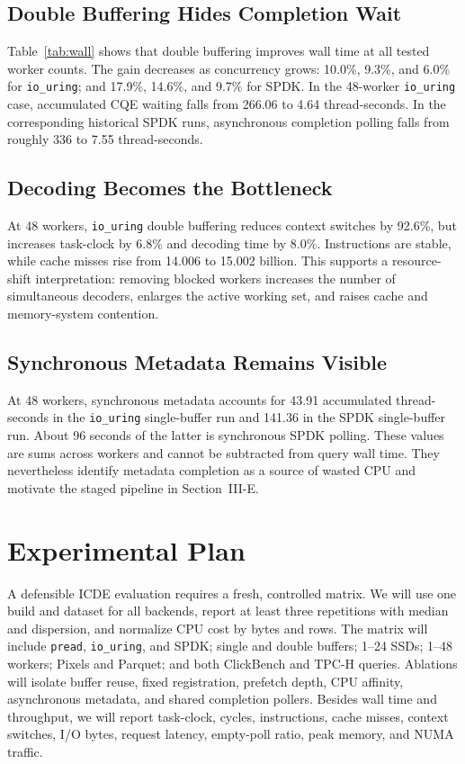 \documentclass[conference]{IEEEtran}
\begin{document}
\subsection{Double Buffering Hides Completion Wait}

Table~\ref{tab:wall} shows that double buffering improves wall time at all
tested worker counts.  The gain decreases as concurrency grows: 10.0\%, 9.3\%,
and 6.0\% for \texttt{io\_uring}; and 17.9\%, 14.6\%, and 9.7\% for SPDK.  In
the 48-worker \texttt{io\_uring} case, accumulated CQE waiting falls from
266.06 to 4.64 thread-seconds.  In the corresponding historical SPDK runs,
asynchronous completion polling falls from roughly 336 to 7.55 thread-seconds.

\subsection{Decoding Becomes the Bottleneck}

At 48 workers, \texttt{io\_uring} double buffering reduces context switches by
92.6\%, but increases task-clock by 6.8\% and decoding time by 8.0\%.
Instructions are stable, while cache misses rise from 14.006 to 15.002 billion.
This supports a resource-shift interpretation: removing blocked workers
increases the number of simultaneous decoders, enlarges the active working set,
and raises cache and memory-system contention.

\subsection{Synchronous Metadata Remains Visible}

At 48 workers, synchronous metadata accounts for 43.91 accumulated
thread-seconds in the \texttt{io\_uring} single-buffer run and 141.36 in the
SPDK single-buffer run.  About 96 seconds of the latter is synchronous SPDK
polling.  These values are sums across workers and cannot be subtracted from
query wall time.  They nevertheless identify metadata completion as a source
of wasted CPU and motivate the staged pipeline in Section~III-E.

\section{Experimental Plan}

A defensible ICDE evaluation requires a fresh, controlled matrix.  We will use
one build and dataset for all backends, report at least three repetitions with
median and dispersion, and normalize CPU cost by bytes and rows.  The matrix
will include \texttt{pread}, \texttt{io\_uring}, and SPDK; single and double
buffers; 1--24 SSDs; 1--48 workers; Pixels and Parquet; and both ClickBench and
TPC-H queries.  Ablations will isolate buffer reuse, fixed registration,
prefetch depth, CPU affinity, asynchronous metadata, and shared completion
pollers.  Besides wall time and throughput, we will report task-clock, cycles,
instructions, cache misses, context switches, I/O bytes, request latency,
empty-poll ratio, peak memory, and NUMA traffic.
\end{document}
